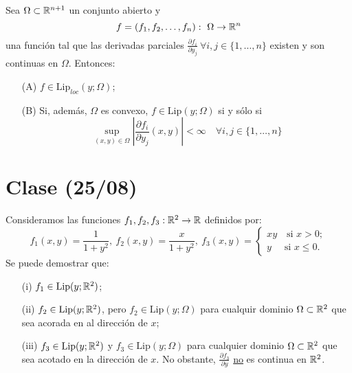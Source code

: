 \documentclass[a4paper]{report}
\begin{document}
\begin{theorem}
	Sea $\Omega\subset\mathbb{R}^{n+1}$ un conjunto abierto y
	\[ f = (f_1,f_2,\dots,f_n):\ \Omega \to \mathbb{R}^n \]
	\noindent una función tal que las derivadas parciales $\frac{\partial f_i}{\partial y_j}\ \forall i,j \in \{1,\dots,n\}$ existen y son continuas en $\Omega$. Entonces:
	\begin{enumerate}
		\item[(A)] $f \in \text{Lip}_{\textit{loc}}(y;\Omega)$;

		\item[(B)] Si, además, $\Omega$ es convexo, $f \in \text{Lip}(y;\Omega)$ si y sólo si
		\[ \sup_{(x,y)\in\Omega} \left| \frac{\partial f_i}{\partial y_j}(x,y) \right| < \infty \quad \forall i,j \in \{ 1,\dots, n \} \]
	\end{enumerate}
\end{theorem}



\section{Clase (25/08)}

\begin{remark}
	Consideramos las funciones $f_1,f_2,f_3:\mathbb{R}^2 \to \mathbb{R}$ definidos por:
	\[ f_1(x,y)  = \frac{1}{1+y^2},\ f_2(x,y) = \frac{x}{1+y^2},\ f_3(x,y)= \begin{cases}
		xy \quad \text{si } x>0; \\
		y \quad \text{ si } x\leq 0.
	\end{cases} \]
	Se puede demostrar que:
	\begin{enumerate}
		\item[(i)] $f_1 \in \text{Lip}(y;\mathbb{R}^2)$;
		
		\item[(ii)] $f_2 \in \text{Lip}(y;\mathbb{R}^2)$, pero $f_2 \in \text{Lip}(y;\Omega)$ para cualquir dominio $\Omega \subset \mathbb{R}^2$ que sea acorada en al dirección de $x$;

		\item[(iii)] $f_3 \in \text{Lip}(y;\mathbb{R}^2)$ y $f_3 \in \text{Lip}(y;\Omega)$ para cualquier dominio $\Omega \subset \mathbb{R}^2$ que sea acotado en la dirección de $x$. No obstante, $\frac{\partial f_3}{\partial y}$ \underline{no} es continua en $\mathbb{R}^2$.
	\end{enumerate}
\end{remark}
\end{document}
